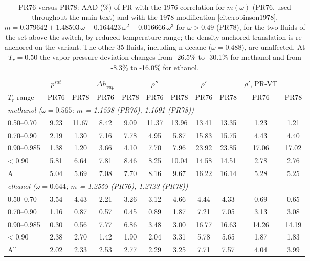 \begin{table}[H]
\centering
\caption{PR76 versus PR78: AAD (\%) of PR with the 1976 correlation for $m(\omega)$ (PR76, used throughout the main text) and with the 1978 modification [cite:robinson1978], $m = 0.379642 + 1.48503\,\omega - 0.164423\,\omega^2 + 0.016666\,\omega^3$ for $\omega > 0.49$ (PR78), for the two fluids of the set above the switch, by reduced-temperature range; the density-anchored translation is re-anchored on the variant. The other 35 fluids, including n-decane ($\omega = 0.488$), are unaffected. At $T_r = 0.50$ the vapor-pressure deviation changes from -26.5\% to -30.1\% for methanol and from -8.3\% to -16.0\% for ethanol.}
\label{tab:tabS_pr78}
\small
\begin{tabular}{lcccccccccc}
\toprule
 & $p^{sat}$ &  & $\Delta h_{vap}$ &  & $\rho''$ &  & $\rho'$ &  & $\rho'$, PR-VT &  \\
$T_r$ range & PR76 & PR78 & PR76 & PR78 & PR76 & PR78 & PR76 & PR78 & PR76 & PR78 \\
\midrule
\multicolumn{11}{l}{\emph{methanol ($\omega = 0.565$; $m$ = 1.1598 (PR76), 1.1691 (PR78))}} \\
0.50--0.70 & 9.23 & 11.67 & 8.42 & 9.09 & 11.37 & 13.96 & 13.41 & 13.35 & 1.23 & 1.21 \\
0.70--0.90 & 2.19 & 1.30 & 7.16 & 7.78 & 4.95 & 5.87 & 15.83 & 15.75 & 4.43 & 4.40 \\
0.90--0.985 & 1.38 & 1.20 & 3.66 & 4.10 & 7.70 & 7.96 & 23.92 & 23.85 & 17.06 & 17.02 \\
< 0.90 & 5.81 & 6.64 & 7.81 & 8.46 & 8.25 & 10.04 & 14.58 & 14.51 & 2.78 & 2.76 \\
All & 5.04 & 5.69 & 7.08 & 7.70 & 8.16 & 9.67 & 16.22 & 16.14 & 5.28 & 5.25 \\
\multicolumn{11}{l}{\emph{ethanol ($\omega = 0.644$; $m$ = 1.2559 (PR76), 1.2723 (PR78))}} \\
0.50--0.70 & 3.54 & 4.43 & 2.21 & 3.26 & 3.12 & 4.66 & 4.44 & 4.33 & 0.69 & 0.65 \\
0.70--0.90 & 1.16 & 0.87 & 0.57 & 0.45 & 0.89 & 1.87 & 7.21 & 7.05 & 3.13 & 3.08 \\
0.90--0.985 & 0.30 & 0.56 & 7.77 & 6.86 & 3.48 & 3.00 & 16.77 & 16.63 & 14.26 & 14.19 \\
< 0.90 & 2.38 & 2.70 & 1.42 & 1.90 & 2.04 & 3.31 & 5.78 & 5.65 & 1.87 & 1.83 \\
All & 2.02 & 2.33 & 2.53 & 2.77 & 2.29 & 3.25 & 7.71 & 7.57 & 4.04 & 3.99 \\
\bottomrule
\end{tabular}
\end{table}
